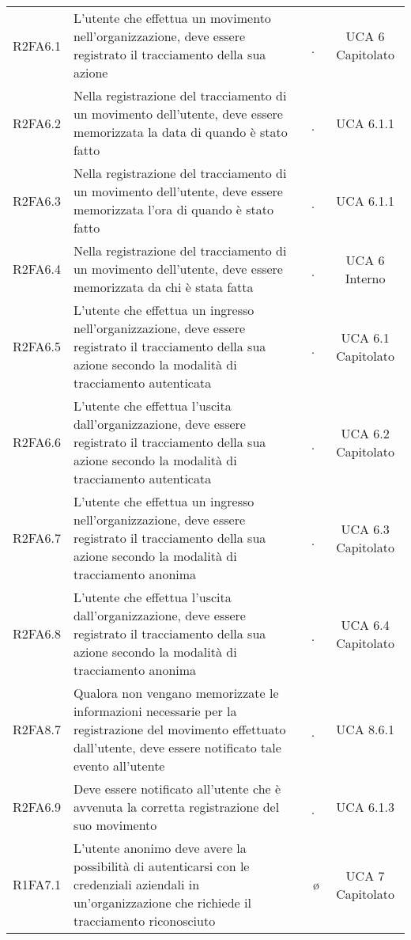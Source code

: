 {\begin{longtable}{ c C{4cm} c c}
R2FA6.1 & L’utente che effettua un movimento nell’organizzazione, deve essere registrato il tracciamento della sua azione & \d & UCA 6 Capitolato \\

R2FA6.2 & Nella registrazione del tracciamento di un movimento dell’utente, deve essere memorizzata la data di quando è stato fatto & \d & UCA 6.1.1 \\

R2FA6.3 & Nella registrazione del tracciamento di un movimento dell’utente, deve essere memorizzata l’ora di quando è stato fatto & \d & UCA 6.1.1 \\

R2FA6.4 & Nella registrazione del tracciamento di un movimento dell’utente, deve essere memorizzata da chi è stata fatta & \d & UCA 6 Interno \\

R2FA6.5 & L’utente che effettua un ingresso nell’organizzazione, deve essere registrato il tracciamento della sua azione secondo la modalità di tracciamento autenticata & \d & UCA 6.1 Capitolato \\

R2FA6.6 & L’utente che effettua l’uscita dall’organizzazione, deve essere registrato il tracciamento della sua azione secondo la modalità di tracciamento autenticata & \d & UCA 6.2 Capitolato \\

R2FA6.7 & L’utente che effettua un ingresso nell’organizzazione, deve essere registrato il tracciamento della sua azione secondo la modalità di tracciamento anonima & \d & UCA 6.3 Capitolato \\

R2FA6.8 & L’utente che effettua l’uscita dall’organizzazione, deve essere registrato il tracciamento della sua azione secondo la modalità di tracciamento anonima & \d & UCA 6.4 Capitolato \\

R2FA8.7 & Qualora non vengano memorizzate le informazioni necessarie per la registrazione del movimento effettuato dall’utente, deve essere notificato tale evento all’utente & \d & UCA 8.6.1 \\

R2FA6.9 & Deve essere notificato all’utente che è avvenuta la corretta registrazione del suo movimento & \d & UCA 6.1.3 \\


R1FA7.1 & L'utente anonimo deve avere la possibilità di autenticarsi con le credenziali aziendali in un'organizzazione che richiede il tracciamento riconosciuto & \o & UCA 7 Capitolato \\


\end{longtable}}
